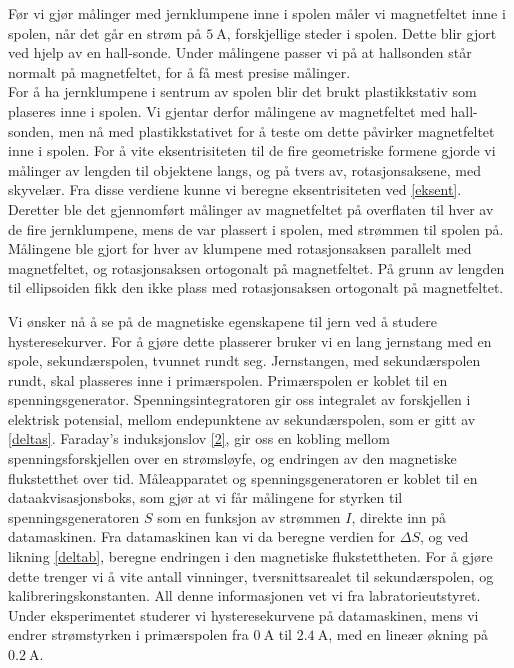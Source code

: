 \documentclass[%
 reprint,
 amsmath,amssymb,
 aps,
]{revtex4-1}
\begin{document}
Før vi gjør målinger med jernklumpene inne i spolen måler vi magnetfeltet inne i spolen, når det går en strøm på $\SI{5}{\ampere}$, forskjellige steder i spolen. Dette blir gjort ved hjelp av en hall-sonde. Under målingene passer vi på at hallsonden står normalt på magnetfeltet, for å få mest presise målinger.\\For å ha jernklumpene i sentrum av spolen blir det brukt plastikkstativ som plaseres inne i spolen. Vi gjentar derfor målingene av magnetfeltet med hall-sonden, men nå med plastikkstativet for å teste om dette påvirker magnetfeltet inne i spolen. For å vite eksentrisiteten til de fire geometriske formene gjorde vi målinger av lengden til objektene langs, og på tvers av, rotasjonsaksene, med skyvelær. Fra disse verdiene kunne vi beregne eksentrisiteten ved \eqref{eksent}.\\
Deretter ble det gjennomført målinger av magnetfeltet på overflaten til hver av de fire jernklumpene, mens de var plassert i spolen, med strømmen til spolen på. Målingene ble gjort for hver av klumpene med rotasjonsaksen parallelt med magnetfeltet, og rotasjonsaksen ortogonalt på magnetfeltet. På grunn av lengden til ellipsoiden fikk den ikke plass med rotasjonsaksen ortogonalt på magnetfeltet.\par
Vi ønsker nå å se på de magnetiske egenskapene til jern ved å studere hysteresekurver. For å gjøre dette plasserer bruker vi en lang jernstang med en spole, sekundærspolen, tvunnet rundt seg. Jernstangen, med sekundærspolen rundt, skal plasseres inne i primærspolen. Primærspolen er koblet til en spenningsgenerator. Spenningsintegratoren gir oss integralet av forskjellen i elektrisk potensial, mellom endepunktene av sekundærspolen, som er gitt av \eqref{deltas}. Faraday's induksjonslov \eqref{2}, gir oss en kobling mellom spenningsforskjellen over en strømsløyfe, og endringen av den magnetiske flukstetthet over tid. Måleapparatet og spenningsgeneratoren er koblet til en dataakvisasjonsboks, som gjør at vi får målingene for styrken til spenningsgeneratoren $S$ som en funksjon av strømmen $I$, direkte inn på datamaskinen. Fra datamaskinen kan vi da beregne verdien for $\Delta S$, og ved likning \eqref{deltab}, beregne endringen i den magnetiske flukstettheten. For å gjøre dette trenger vi å vite antall vinninger, tversnittsarealet til sekundærspolen, og kalibreringskonstanten. All denne informasjonen vet vi fra labratorieutstyret. Under eksperimentet studerer vi hysteresekurvene på datamaskinen, mens vi endrer strømstyrken i primærspolen fra $\SI{0}{\ampere}$ til $\SI{2.4}{\ampere}$, med en lineær økning på $\SI{0.2}{\ampere}$.
\end{document}
